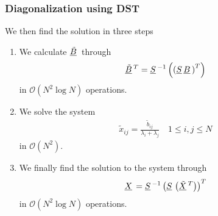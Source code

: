 \documentclass{beamer}
\newcommand{\ub}[1]{\underbar{$#1$}\,}
\begin{document}
\begin{frame}\frametitle{Diagonalization using DST}
  We then find the solution in three steps
  \begin{enumerate}
    \item We calculate $\ub{\tilde{B}}$ through
      \[
        \ub{\tilde{B}}^T = \ub{S}^{-1}\left(\left(\ub{S}\ub{B}\right)^T\right)
      \]
      in $\mathcal{O}\left(N^2\log N\right)$ operations.
    \item We solve the system
      \[
        \begin{split}
          \tilde{x}_{ij} = \frac{\tilde{b}_{ij}}{\lambda_i+\lambda_j}\quad 1 \leq i,j \leq N
        \end{split}
      \]
      in $\mathcal{O}\left(N^2\right)$.
    \item We finally find the solution to the system through 
      \[
        \ub{X} = \ub{S}^{-1}\left(\ub{S}\left(\ub{\tilde{X}}^T\right)\right)^T
      \]
      in $\mathcal{O}\left(N^2\log N\right)$ operations.
  \end{enumerate}
\end{frame}
\end{document}

